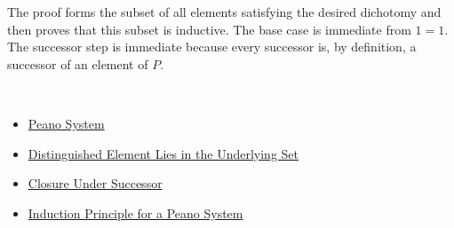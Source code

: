 \begin{remark*}
The proof forms the subset of all elements satisfying the desired dichotomy
and then proves that this subset is inductive. The base case is immediate
from $1=1$. The successor step is immediate because every successor is, by
definition, a successor of an element of $P$.
\end{remark*}

\begin{remark*}[Dependencies]~\\
\begin{itemize}
  \item \hyperref[def:peano-system]{Peano System}
  \item \hyperref[ax:peano-one-in-n]{Distinguished Element Lies in the Underlying Set}
  \item \hyperref[ax:peano-successor-closure]{Closure Under Successor}
  \item \hyperref[thm:induction-principle-for-peano-system]{Induction Principle for a Peano System}
\end{itemize}
\end{remark*}
